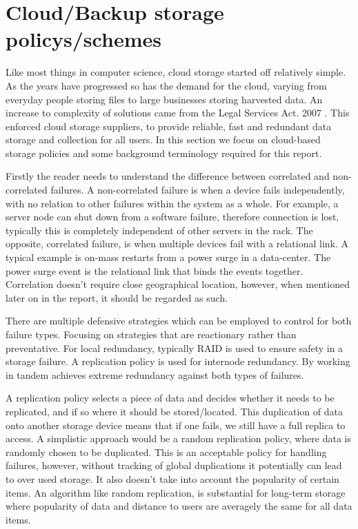 \documentclass{UoYCSproject}
\begin{document}
\section{Cloud/Backup storage policys/schemes}
\label{sec:Cloud}

Like most things in computer science, cloud storage started off relatively simple.
As the years have progressed so has the demand for the cloud, varying from everyday people storing files to large businesses storing harvested data.
An increase to complexity of solutions came from the Legal Services Act. 2007 \cite{LSA}.
This enforced cloud storage suppliers, to provide reliable, fast and redundant data storage and collection for all users.
In this section we focus on cloud-based storage policies and some background terminology required for this report.

Firstly the reader needs to understand the difference between correlated and non-correlated failures.
A non-correlated failure is when a device fails independently, with no relation to other failures within the system as a whole.
For example, a server node can shut down from a software failure, therefore connection is lost, typically this is completely independent of other servers in the rack.
The opposite, correlated failure, is when multiple devices fail with a relational link.
A typical example is on-mass restarts from a power surge in a data-center.
The power surge event is the relational link that binds the events together.
Correlation doesn't require close geographical location, however, when mentioned later on in the report, it should be regarded as such.

There are multiple defensive strategies which can be employed to control for both failure types.
Focusing on strategies that are reactionary rather than preventative.
For local redundancy, typically RAID is used to ensure safety in a storage failure.
A replication policy \cite{Avalability storage} is used for internode redundancy.
By working in tandem achieves extreme redundancy against both types of failures.

A replication policy selects a piece of data and decides whether it needs to be replicated, and if so where it should be stored/located.
This duplication of data onto another storage device means that if one fails, we still have a full replica to access.
A simplistic approach would be a random replication policy, where data is randomly chosen to be duplicated.
This is an acceptable policy for handling failures, however, without tracking of global duplications it potentially can lead to over used storage.
It also doesn’t take into account the popularity of certain items.
An algorithm like random replication, is substantial for long-term storage where popularity of data and distance to users are averagely the same for all data items.
\end{document}
